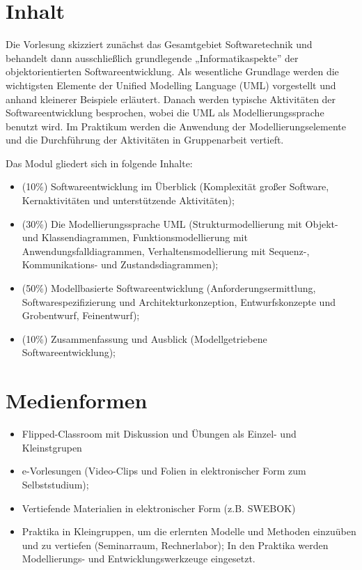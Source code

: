 \hypertarget{inhaltpathlabelmi-2017modulbeschreibungen-bachelorba_softwaretechnik}{%
\section*{Inhalt\label{/mi-2017/modulbeschreibungen-bachelor/BA_Softwaretechnik}}\label{inhaltpathlabelmi-2017modulbeschreibungen-bachelorba_softwaretechnik}}

Die Vorlesung skizziert zunächst das Gesamtgebiet Softwaretechnik und
behandelt dann ausschließlich grundlegende „Informatikaspekte'' der
objektorientierten Softwareentwicklung. Als wesentliche Grundlage werden
die wichtigsten Elemente der Unified Modelling Language (UML)
vorgestellt und anhand kleinerer Beispiele erläutert. Danach werden
typische Aktivitäten der Softwareentwicklung besprochen, wobei die UML
als Modellierungssprache benutzt wird. Im Praktikum werden die Anwendung
der Modellierungselemente und die Durchführung der Aktivitäten in
Gruppenarbeit vertieft.

Das Modul gliedert sich in folgende Inhalte:

\begin{itemize}
\tightlist
\item
  (10\%) Softwareentwicklung im Überblick (Komplexität großer Software,
  Kernaktivitäten und unterstützende Aktivitäten);
\item
  (30\%) Die Modellierungssprache UML (Strukturmodellierung mit Objekt-
  und Klassendiagrammen, Funktionsmodellierung mit
  Anwendungsfalldiagrammen, Verhaltensmodellierung mit Sequenz-,
  Kommunikations- und Zustandsdiagrammen);
\item
  (50\%) Modellbasierte Softwareentwicklung (Anforderungsermittlung,
  Softwarespezifizierung und Architekturkonzeption, Entwurfskonzepte und
  Grobentwurf, Feinentwurf);
\item
  (10\%) Zusammenfassung und Ausblick (Modellgetriebene
  Softwareentwicklung);
\end{itemize}

\hypertarget{medienformenpathlabelmi-2017modulbeschreibungen-bachelorba_softwaretechnik}{%
\section*{Medienformen\label{/mi-2017/modulbeschreibungen-bachelor/BA_Softwaretechnik}}\label{medienformenpathlabelmi-2017modulbeschreibungen-bachelorba_softwaretechnik}}

\begin{itemize}
\tightlist
\item
  Flipped-Classroom mit Diskussion und Übungen als Einzel- und
  Kleinstgrupen
\item
  e-Vorlesungen (Video-Clips und Folien in elektronischer Form zum
  Selbststudium);
\item
  Vertiefende Materialien in elektronischer Form (z.B. SWEBOK)
\item
  Praktika in Kleingruppen, um die erlernten Modelle und Methoden
  einzuüben und zu vertiefen (Seminarraum, Rechnerlabor); In den
  Praktika werden Modellierungs- und Entwicklungswerkzeuge eingesetzt.
\end{itemize}

